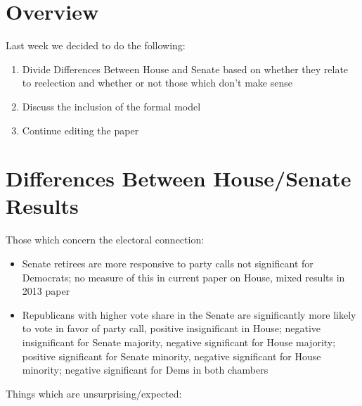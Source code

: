 \documentclass[12pt]{article}
\begin{document}
\section{Overview}

Last week we decided to do the following:

\begin{enumerate}
	\item Divide Differences Between House and Senate based on whether they relate to reelection and whether or not those which don't make sense
	
	\item Discuss the inclusion of the formal model
	
	\item Continue editing the paper
\end{enumerate}

\section{Differences Between House/Senate Results}

Those which concern the electoral connection:

\begin{itemize}
	
	\item Senate retirees are more responsive to party calls not significant for Democrats; no measure of this in current paper on House, mixed results in 2013 paper 
	
	\item Republicans with higher vote share in the Senate are significantly more likely to vote in favor of party call, positive insignificant in House; negative insignificant for Senate majority, negative significant for House majority; positive significant for Senate minority, negative significant for House minority; negative significant for Dems in both chambers
	
\end{itemize}

\noindent
Things which are unsurprising/expected:
\end{document}
